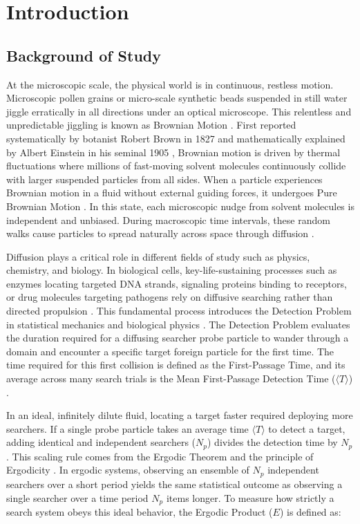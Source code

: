 \chapter{Introduction}
\label{chap:1}
\section{Background of Study}
\label{Sec:1.1}
\hspace{\parindent} At the microscopic scale, the physical world is in continuous, restless motion. Microscopic pollen grains or micro-scale synthetic beads suspended in still water jiggle erratically in all directions under an optical microscope. This relentless and unpredictable jiggling is known as Brownian Motion \cite{Brown1828}. First reported systematically by botanist Robert Brown in 1827 and mathematically explained by Albert Einstein in his seminal 1905 \cite{Einstein1956}, Brownian motion is driven by thermal fluctuations where millions of fast-moving solvent molecules continuously collide with larger suspended particles from all sides. When a particle experiences Brownian motion in a fluid without external guiding forces, it undergoes Pure Brownian Motion \cite{Cusi2018}. In this state, each microscopic nudge from solvent molecules is independent and unbiased. During macroscopic time intervals, these random walks cause particles to spread naturally across space through diffusion \cite{Einstein1956, Uhlenbeck1930}.

\hspace{\parindent} Diffusion plays a critical role in different fields of study such as physics, chemistry, and biology. In biological cells, key-life-sustaining processes such as enzymes locating targeted DNA strands, signaling proteins binding to receptors, or drug molecules targeting pathogens rely on diffusive searching rather than directed propulsion \cite{Redner2001,Loverdo2008}. This fundamental process introduces the Detection Problem in statistical mechanics and biological physics \cite{Benichou2011, Redner2001}. The Detection Problem evaluates the duration required for a diffusing searcher probe particle to wander through a domain and encounter a specific target foreign particle for the first time. The time required for this first collision is defined as the First-Passage Time, and its average across many search trials is the Mean First-Passage Detection Time ($\langle T\rangle$) \cite{Redner2001}.

\hspace{\parindent} In an ideal, infinitely dilute fluid, locating a target faster required deploying more searchers. If a single probe particle takes an average time $\langle T\rangle$ to detect a target,  adding identical and independent searchers ($N_p$) divides the detection time by $N_p$. This scaling rule comes from the Ergodic Theorem and the principle of Ergodicity \cite{Zwanzig2001}. In ergodic systems, observing an ensemble of $N_p$ independent searchers over a short period yields the same statistical outcome as observing a single searcher over a time period $N_p$ items longer. To measure how strictly a search system obeys this ideal behavior, the Ergodic Product ($E$) is defined as:

